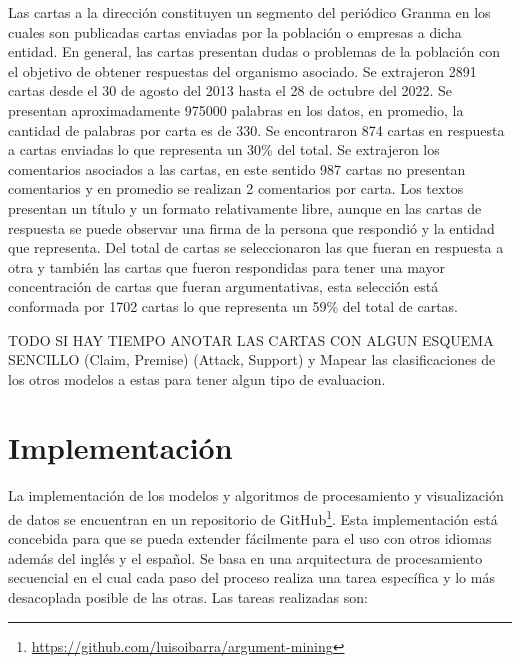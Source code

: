 Las cartas a la dirección constituyen un segmento del periódico Granma en los cuales son publicadas
cartas enviadas por la población o empresas a dicha entidad. En general, las cartas 
presentan dudas o problemas de la población con el objetivo de obtener respuestas del organismo
asociado. Se extrajeron 2891 cartas desde el 30 de agosto del 2013 hasta el 28 de octubre del 2022. Se 
presentan aproximadamente 975000 palabras en los datos, en promedio, la cantidad de palabras por carta es de 330.
Se encontraron 874 cartas en respuesta a cartas enviadas lo que representa un 30\% del total. Se extrajeron
los comentarios asociados a las cartas, en este sentido 987 cartas no presentan comentarios y en promedio 
se realizan 2 comentarios por carta. Los textos presentan un título y un formato relativamente libre, 
aunque en las cartas de respuesta se puede observar una firma de la persona que respondió y la entidad que 
representa. Del total de cartas se seleccionaron las que fueran en respuesta a otra y también las 
cartas que fueron respondidas para tener una mayor concentración de cartas que fueran argumentativas, 
esta selección está conformada por 1702 cartas lo que representa un 59\% del total de cartas.

TODO SI HAY TIEMPO ANOTAR LAS CARTAS CON ALGUN ESQUEMA SENCILLO (Claim, Premise) (Attack, Support) y Mapear 
las clasificaciones de los otros modelos a estas para tener algun tipo de evaluacion.

\section{Implementación}

La implementación de los modelos y algoritmos de procesamiento y visualización de datos se encuentran en 
un repositorio de GitHub\footnote{\url{https://github.com/luisoibarra/argument-mining}}. Esta implementación
está concebida para que se pueda extender fácilmente para el uso con otros idiomas además del inglés y el 
español. Se basa en una arquitectura de procesamiento secuencial en el cual cada paso del proceso realiza
una tarea específica y lo más desacoplada posible de las otras. Las tareas realizadas son:


